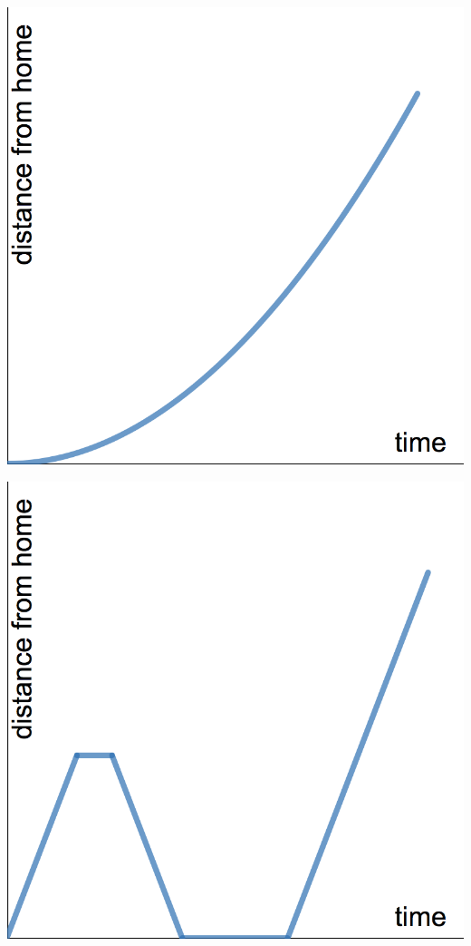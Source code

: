 \documentclass[11pt]{exam}
\theoremstyle{definition}
\begin{document}
\begin{questions}
\begin{enumerate}[(I)]
\begin{minipage}{.25\textwidth}
	\end{minipage}
	\begin{minipage}{.25\textwidth}
	\item \includegraphics[scale=0.1]{Figures/graph3.png}
	\end{minipage}
	\begin{minipage}{.25\textwidth}
	\item \includegraphics[scale=0.1]{Figures/graph4.png}
	\end{minipage}
	\end{enumerate}


\end{questions}
\end{document}
